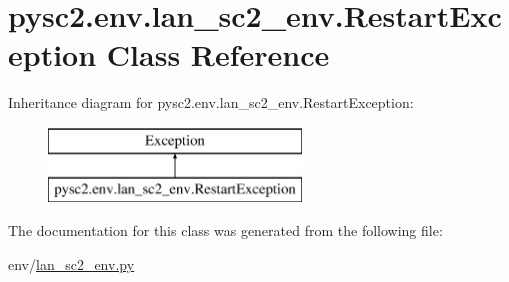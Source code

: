 \hypertarget{classpysc2_1_1env_1_1lan__sc2__env_1_1_restart_exception}{}\section{pysc2.\+env.\+lan\+\_\+sc2\+\_\+env.\+Restart\+Exception Class Reference}
\label{classpysc2_1_1env_1_1lan__sc2__env_1_1_restart_exception}
Inheritance diagram for pysc2.\+env.\+lan\+\_\+sc2\+\_\+env.\+Restart\+Exception\+:\begin{figure}[H]
\begin{center}
\leavevmode
\includegraphics[height=2.000000cm]{classpysc2_1_1env_1_1lan__sc2__env_1_1_restart_exception}
\end{center}
\end{figure}


The documentation for this class was generated from the following file\+:\begin{DoxyCompactItemize}
\item 
env/\mbox{\hyperlink{lan__sc2__env_8py}{lan\+\_\+sc2\+\_\+env.\+py}}\end{DoxyCompactItemize}
